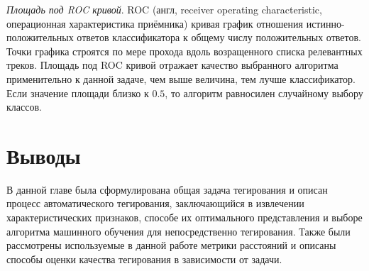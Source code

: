\emph{Площадь под ROC кривой}. ROC (англ, receiver operating characteristic, операционная характеристика приёмника) кривая \ld график отношения истинно-положительных ответов классификатора
к общему числу положительных ответов. Точки графика строятся по мере прохода вдоль возращенного списка релевантных треков. Площадь под ROC кривой отражает качество выбранного алгоритма применительно
к данной задаче, чем выше величина, тем лучше классификатор. Если значение площади близко к $0.5$, то алгоритм равносилен случайному выбору классов.

\section{Выводы}

В данной главе была сформулирована общая задача тегирования и описан процесс автоматического тегирования, заключающийся в извлечении характеристических признаков, способе их 
оптимального представления и выборе алгоритма машинного обучения для непосредственно тегирования. Также были рассмотрены используемые в данной работе метрики расстояний и 
описаны способы оценки качества тегирования в зависимости от задачи.





